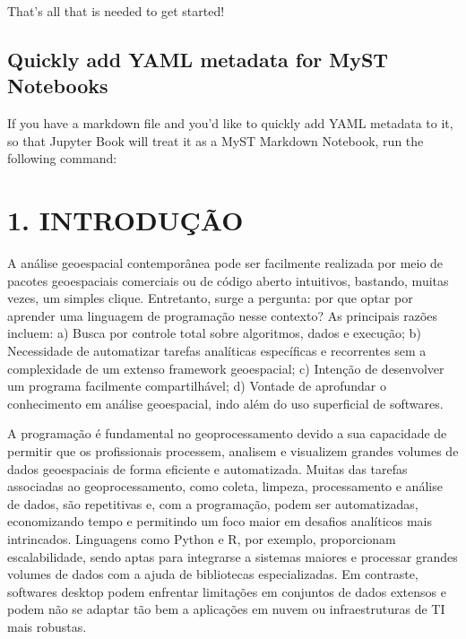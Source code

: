 \documentclass[letterpaper,10pt,english]{jupyterBook}
\begin{document}
\sphinxAtStartPar
That’s all that is needed to get started!


\section{Quickly add YAML metadata for MyST Notebooks}
\label{\detokenize{markdown-notebooks:quickly-add-yaml-metadata-for-myst-notebooks}}
\sphinxAtStartPar
If you have a markdown file and you’d like to quickly add YAML metadata to it, so that Jupyter Book will treat it as a MyST Markdown Notebook, run the following command:

\begin{sphinxVerbatim}[commandchars=\\\{\}]
   
\end{sphinxVerbatim}

\sphinxstepscope


\chapter{1. INTRODUÇÃO}
\label{\detokenize{introducao:introducao}}\label{\detokenize{introducao::doc}}
\sphinxAtStartPar
A análise geoespacial contemporânea pode ser facilmente realizada por meio de pacotes geoespaciais comerciais ou de código aberto intuitivos, bastando, muitas vezes, um simples clique. Entretanto, surge a pergunta: por que optar por aprender uma linguagem de programação nesse contexto? As principais razões incluem: a) Busca por controle total sobre algoritmos, dados e execução; b) Necessidade de automatizar tarefas analíticas específicas e recorrentes sem a complexidade de um extenso framework geoespacial; c) Intenção de desenvolver um programa facilmente compartilhável; d) Vontade de aprofundar o conhecimento em análise geoespacial, indo além do uso superficial de softwares.

\sphinxAtStartPar
A programação é fundamental no geoprocessamento devido a sua capacidade de permitir que os profissionais processem, analisem e visualizem grandes volumes de dados geoespaciais de forma eficiente e automatizada. Muitas das tarefas associadas ao geoprocessamento, como coleta, limpeza, processamento e análise de dados, são repetitivas e, com a programação, podem ser automatizadas, economizando tempo e permitindo um foco maior em desafios analíticos mais intrincados. Linguagens como Python e R, por exemplo, proporcionam escalabilidade, sendo aptas para integrar\sphinxhyphen{}se a sistemas maiores e processar grandes volumes de dados com a ajuda de bibliotecas especializadas. Em contraste, softwares desktop podem enfrentar limitações em conjuntos de dados extensos e podem não se adaptar tão bem a aplicações em nuvem ou infraestruturas de TI mais robustas.
\end{document}
